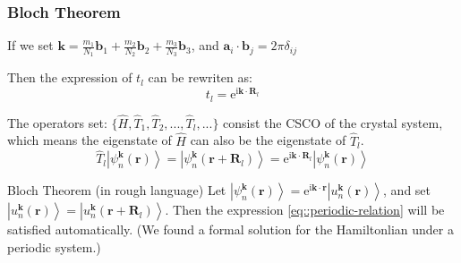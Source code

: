 \documentclass{beamer}
\begin{document}
  \begin{frame}
    \frametitle{Bloch Theorem}
  
    If we set \(\mathbf{k} = \frac{m_1}{N_1}\mathbf{b}_1+\frac{m_2}{N_2}\mathbf{b}_2+\frac{m_3}{N_3}\mathbf{b}_3\), and \(\mathbf{a}_i\cdot\mathbf{b}_j = 2\pi\delta_{ij}\)

    Then the expression of \(t_l\) can be rewriten as:
    \begin{equation}
      t_l = \mathrm{e}^{\mathrm{i}\mathbf{k}\cdot\mathbf{R}_l}
    \end{equation}

    The operators set: \(\{\widehat{H}, \widehat{T}_1, \widehat{T}_2,...,\widehat{T}_l,...\}\) consist the CSCO of the crystal system, which means the eigenstate of \(\widehat{H}\) can also be the eigenstate of \(\widehat{T}_l\).
    \begin{equation}
      \label{eq::periodic-relation}
      \widehat{T}_l\left|\psi_n^{\mathbf{k}}(\mathbf{r})\right\rangle = \left|\psi_n^{\mathbf{k}}(\mathbf{r}+\mathbf{R}_l)\right\rangle = \mathrm{e}^{\mathrm{i}\mathbf{k}\cdot\mathbf{R}_l}\left|\psi_n^{\mathbf{k}}(\mathbf{r})\right\rangle
    \end{equation}

    \begin{block}{Bloch Theorem (in rough language)}
      Let \(\left|\psi_n^{\mathbf{k}}(\mathbf{r})\right\rangle = \mathrm{e}^{\mathrm{i}\mathbf{k}\cdot\mathbf{r}}\left|u_n^{\mathbf{k}}(\mathbf{r})\right\rangle\), and set \(\left|u_n^{\mathbf{k}}(\mathbf{r})\right\rangle = \left|u_n^{\mathbf{k}}(\mathbf{r}+\mathbf{R}_l)\right\rangle\). Then the expression \eqref{eq::periodic-relation} will be satisfied automatically. (We found a formal solution for the Hamiltonlian under a periodic system.)    
    \end{block}

    \end{frame}
\end{document}
